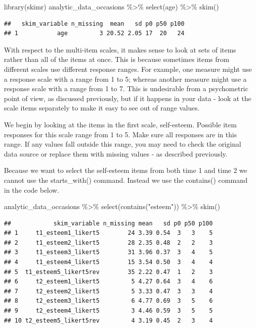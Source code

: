 \documentclass[
]{krantz}
\makeatletter
\newenvironment{Shaded}{\begin{snugshade}}{\end{snugshade}}
\newcommand{\FunctionTok}[1]{\textcolor[rgb]{0,0,0}{#1}}
\newcommand{\NormalTok}[1]{#1}
\newcommand{\SpecialCharTok}[1]{\textcolor[rgb]{0,0,0}{#1}}
\newcommand{\StringTok}[1]{\textcolor[rgb]{0.5,0.5,0.5}{#1}}
\newenvironment{kframe}{%
\medskip{}
\setlength{\fboxsep}{.8em}
 \def\at@end@of@kframe{}%
 \ifinner\ifhmode%
  \def\at@end@of@kframe{\end{minipage}}%
  \begin{minipage}{\columnwidth}%
 \fi\fi%
 \def\FrameCommand##1{\hskip\@totalleftmargin \hskip-\fboxsep
 \colorbox{shadecolor}{##1}\hskip-\fboxsep
     \hskip-\linewidth \hskip-\@totalleftmargin \hskip\columnwidth}%
 \MakeFramed {\advance\hsize-\width
   \@totalleftmargin\z@ \linewidth\hsize
   \@setminipage}}%
 {\par\unskip\endMakeFramed%
 \at@end@of@kframe}
\renewenvironment{Shaded}{\begin{kframe}}{\end{kframe}}
\makeatother
\begin{document}
\begin{Shaded}
\begin{Highlighting}[]
\FunctionTok{library}\NormalTok{(skimr)}
\NormalTok{analytic\_data\_occasions }\SpecialCharTok{\%\textgreater{}\%}
  \FunctionTok{select}\NormalTok{(age) }\SpecialCharTok{\%\textgreater{}\%}
  \FunctionTok{skim}\NormalTok{()}
\end{Highlighting}
\end{Shaded}

\begin{verbatim}
##   skim_variable n_missing  mean   sd p0 p50 p100
## 1           age         3 20.52 2.05 17  20   24
\end{verbatim}

With respect to the multi-item scales, it makes sense to look at sets of items rather than all of the items at once. This is because sometimes items from different scales use different response ranges. For example, one measure might use a response scale with a range from 1 to 5; whereas another measure might use a response scale with a range from 1 to 7. This is undesirable from a psychometric point of view, as discussed previously, but if it happens in your data - look at the scale items separately to make it easy to see out of range values.

We begin by looking at the items in the first scale, self-esteem. Possible item responses for this scale range from 1 to 5. Make sure all responses are in this range. If any values fall outside this range, you may need to check the original data source or replace them with missing values - as described previously.

Because we want to select the self-esteem items from both time 1 and time 2 we cannot use the starts\_with() command. Instead we use the contains() command in the code below.

\begin{Shaded}
\begin{Highlighting}[]
\NormalTok{analytic\_data\_occasions }\SpecialCharTok{\%\textgreater{}\%}
  \FunctionTok{select}\NormalTok{(}\FunctionTok{contains}\NormalTok{(}\StringTok{"esteem"}\NormalTok{)) }\SpecialCharTok{\%\textgreater{}\%}
  \FunctionTok{skim}\NormalTok{()}
\end{Highlighting}
\end{Shaded}

\begin{verbatim}
##            skim_variable n_missing mean   sd p0 p50 p100
## 1     t1_esteem1_likert5        24 3.39 0.54  3   3    5
## 2     t1_esteem2_likert5        28 2.35 0.48  2   2    3
## 3     t1_esteem3_likert5        31 3.96 0.37  3   4    5
## 4     t1_esteem4_likert5        15 3.54 0.50  3   4    4
## 5  t1_esteem5_likert5rev        35 2.22 0.47  1   2    3
## 6     t2_esteem1_likert5         5 4.27 0.64  3   4    6
## 7     t2_esteem2_likert5         5 3.33 0.47  3   3    4
## 8     t2_esteem3_likert5         6 4.77 0.69  3   5    6
## 9     t2_esteem4_likert5         3 4.46 0.59  3   5    5
## 10 t2_esteem5_likert5rev         4 3.19 0.45  2   3    4
\end{verbatim}
\end{document}
